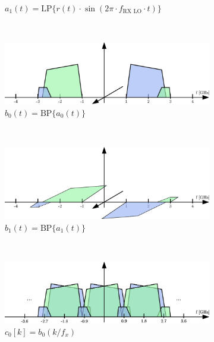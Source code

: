 \begin{figure}[p]
\begin{subfigure}{0.45\textwidth}
    \caption{$a_1(t) = \text{LP}\{r(t) \cdot \sin(2\pi \cdot f_{\text{RX LO}} \cdot t)\}$}
    \label{fig:rx_2_freq_a_1}
  \end{subfigure}
  \vspace{4ex} \\
  \begin{subfigure}{0.45\textwidth}
    \centering
    \includegraphics[width=\textwidth]{figures/rx_2_freq_b_0}
    \caption{$b_0(t) = \text{BP}\{a_0(t)\}$}
    \label{fig:rx_2_freq_b_0}
  \end{subfigure}
  ~
  \begin{subfigure}{0.45\textwidth}
    \centering
    \includegraphics[width=\textwidth]{figures/rx_2_freq_b_1}
    \caption{$b_1(t) = \text{BP}\{a_1(t)\}$}
    \label{fig:rx_2_freq_b_1}
  \end{subfigure}
  \vspace{4ex} \\
  \begin{subfigure}{0.45\textwidth}
    \centering
    \includegraphics[width=\textwidth]{figures/rx_2_freq_c_0}
    \caption{$c_0[k] = b_0(k/f_x)$}
    \label{fig:rx_2_freq_c_0}
  \end{subfigure}
  ~
  \begin{subfigure}{0.45\textwidth}

\end{subfigure}
\end{figure}
